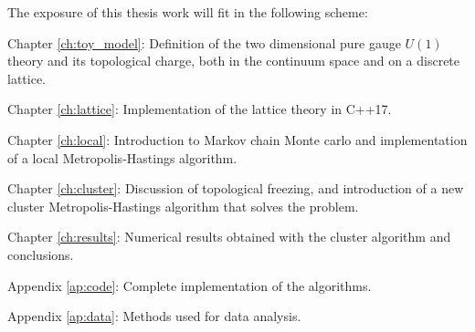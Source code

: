 \noindent
The exposure of this thesis work will fit in the following scheme:
\begin{description}
    \item{Chapter \ref{ch:toy_model}:} Definition of the two dimensional pure gauge $U(1)$ theory and its topological charge,
    both in the continuum space and on a discrete lattice.
    \item{Chapter \ref{ch:lattice}:} Implementation of the lattice theory in C++17.
    \item{Chapter \ref{ch:local}:} Introduction to Markov chain Monte carlo and implementation of a local Metropolis-Hastings algorithm.
    \item{Chapter \ref{ch:cluster}:} Discussion of topological freezing, and introduction of a new cluster Metropolis-Hastings algorithm that solves the problem.
    \item{Chapter \ref{ch:results}:} Numerical results obtained with the cluster algorithm and conclusions.\\
    \item{Appendix \ref{ap:code}:} Complete implementation of the algorithms.
    \item{Appendix \ref{ap:data}:} Methods used for data analysis.
\end{description}

\endgroup

\vfill
